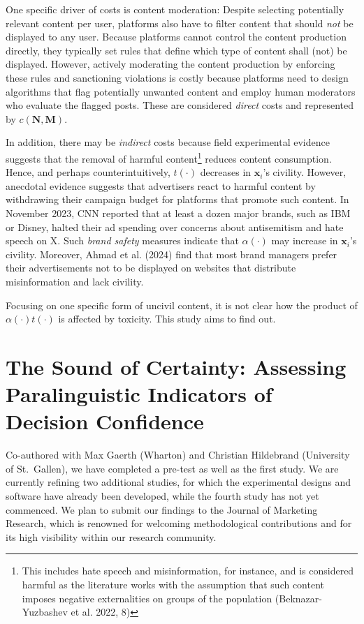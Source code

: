 \documentclass[
  a4paper,
]{scrreprt}
\begin{document}
One specific driver of costs is content moderation: Despite selecting
potentially relevant content per user, platforms also have to filter
content that should \emph{not} be displayed to any user. Because
platforms cannot control the content production directly, they typically
set rules that define which type of content shall (not) be displayed.
However, actively moderating the content production by enforcing these
rules and sanctioning violations is costly because platforms need to
design algorithms that flag potentially unwanted content and employ
human moderators who evaluate the flagged posts. These are considered
\emph{direct} costs and represented by \(c(\mathbf{N}, \mathbf{M})\).

In addition, there may be \emph{indirect} costs because field
experimental evidence suggests that the removal of harmful
content\footnote{This includes hate speech and misinformation, for
  instance, and is considered harmful as the literature works with the
  assumption that such content imposes negative externalities on groups
  of the population (Beknazar-Yuzbashev et al. 2022, 8)} reduces content
consumption. Hence, and perhaps counterintuitively, \(t(\cdot)\)
decreases in \(\mathbf{x}_i\)'s civility. However, anecdotal evidence
suggests that advertisers react to harmful content by withdrawing their
campaign budget for platforms that promote such content. In November
2023, CNN reported that at least a dozen major brands, such as IBM or
Disney, halted their ad spending over concerns about antisemitism and
hate speech on X. Such \emph{brand safety} measures indicate that
\(\alpha(\cdot)\) may increase in \(\mathbf{x}_i\)'s civility. Moreover,
Ahmad et al. (2024) find that most brand managers prefer their
advertisements not to be displayed on websites that distribute
misinformation and lack civility.

Focusing on one specific form of uncivil content, it is not clear how
the product of \(\alpha(\cdot)t(\cdot)\) is affected by toxicity. This
study aims to find out.

\hypertarget{the-sound-of-certainty-assessing-paralinguistic-indicators-of-decision-confidence}{%
\chapter{The Sound of Certainty: Assessing Paralinguistic Indicators of
Decision
Confidence}\label{the-sound-of-certainty-assessing-paralinguistic-indicators-of-decision-confidence}}

Co-authored with Max Gaerth (Wharton) and Christian Hildebrand
(University of St.~Gallen), we have completed a pre-test as well as the
first study. We are currently refining two additional studies, for which
the experimental designs and software have already been developed, while
the fourth study has not yet commenced. We plan to submit our findings
to the Journal of Marketing Research, which is renowned for welcoming
methodological contributions and for its high visibility within our
research community.
\end{document}
